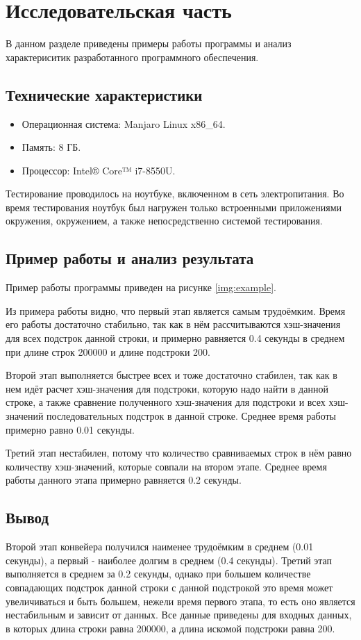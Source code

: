\chapter{Исследовательская часть}

В данном разделе приведены примеры работы программы и анализ характериситик разработанного программного обеспечения.

\section{Технические характеристики}

\begin{itemize}
	\item Операционная система: Manjaro \cite{manjaro} Linux \cite{linux} x86\_64.
	\item Память: 8 ГБ.
	\item Процессор: Intel® Core™ i7-8550U\cite{intel}.
\end{itemize}

Тестирование проводилось на ноутбуке, включенном в сеть электропитания. Во время тестирования ноутбук был нагружен только встроенными приложениями окружения, окружением, а также непосредственно системой тестирования.

\section{Пример работы и анализ результата}

Пример работы программы приведен на рисунке \ref{img:example}.
\clearpage
{}
\clearpage

Из примера работы видно, что первый этап является самым трудоёмким. Время его работы достаточно стабильно, так как в нём рассчитываются хэш-значения для всех подстрок данной строки, и примерно равняется 0.4 секунды в среднем при длине строк 200000 и длине подстроки 200.

Второй этап выполняется быстрее всех и тоже достаточно стабилен, так как в нем идёт расчет хэш-значения для подстроки, которую надо найти в данной строке, а также сравнение полученного хэш-значения для подстроки и всех хэш-значений последовательных подстрок в данной строке. Среднее время работы примерно равно 0.01 секунды.

Третий этап нестабилен, потому что количество сравниваемых строк в нём равно количеству хэш-значений, которые совпали на втором этапе. Среднее время работы данного этапа примерно равняется 0.2 секунды.

\section*{Вывод}

Второй этап конвейера получился наименее трудоёмким в среднем (0.01 секунды), а первый - наиболее долгим в среднем (0.4 секунды). Третий этап выполняется в среднем за 0.2 секунды, однако при большем количестве совпадающих подстрок данной строки с данной подстрокой это время может увеличиваться и быть большем, нежели время первого этапа, то есть оно является нестабильным и зависит от данных. Все данные приведены для входных данных, в которых длина строки равна 200000, а длина искомой подстроки равна 200.
